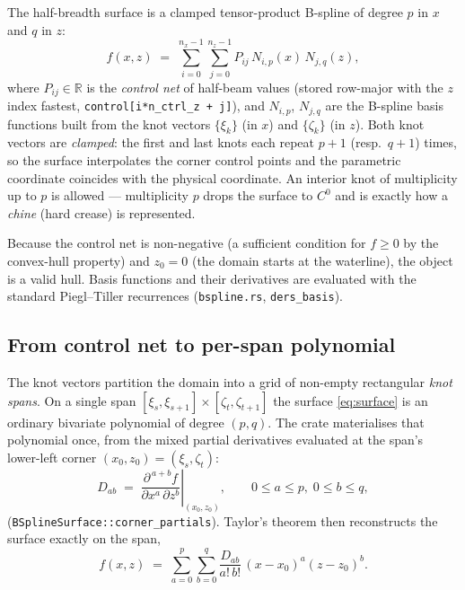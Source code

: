 \documentclass[11pt]{article}
\begin{document}
The half-breadth surface is a clamped tensor-product B-spline of degree $p$ in
$x$ and $q$ in $z$:
\begin{equation}
  f(x, z) \;=\; \sum_{i=0}^{n_x-1}\sum_{j=0}^{n_z-1}
     P_{ij}\, N_{i,p}(x)\, N_{j,q}(z),
  \label{eq:surface}
\end{equation}
where $P_{ij} \in \mathbb{R}$ is the \emph{control net} of half-beam values
(stored row-major with the $z$ index fastest, \texttt{control[i*n\_ctrl\_z + j]}),
and $N_{i,p}$, $N_{j,q}$ are the B-spline basis functions built from the knot
vectors $\{\xi_k\}$ (in $x$) and $\{\zeta_k\}$ (in $z$). Both knot vectors are
\emph{clamped}: the first and last knots each repeat $p+1$ (resp.\ $q+1$) times,
so the surface interpolates the corner control points and the parametric
coordinate coincides with the physical coordinate. An interior knot of
multiplicity up to $p$ is allowed --- multiplicity $p$ drops the surface to
$C^{0}$ and is exactly how a \emph{chine} (hard crease) is represented.

Because the control net is non-negative (a sufficient condition for
$f \ge 0$ by the convex-hull property) and $z_0 = 0$ (the domain starts at the
waterline), the object is a valid hull. Basis functions and their derivatives
are evaluated with the standard Piegl--Tiller recurrences
(\texttt{bspline.rs}, \texttt{ders\_basis}).

\subsection{From control net to per-span polynomial}
\label{sec:spanpoly}

The knot vectors partition the domain into a grid of non-empty rectangular
\emph{knot spans}. On a single span
$[\xi_{s}, \xi_{s+1}] \times [\zeta_{t}, \zeta_{t+1}]$ the surface
\eqref{eq:surface} is an ordinary bivariate polynomial of degree $(p, q)$. The
crate materialises that polynomial once, from the mixed partial derivatives
evaluated at the span's lower-left corner $(x_0, z_0) = (\xi_s, \zeta_t)$:
\begin{equation}
  D_{ab} \;=\; \left.\frac{\partial^{\,a+b} f}{\partial x^{a}\,\partial z^{b}}
    \right|_{(x_0, z_0)},
  \qquad 0 \le a \le p,\; 0 \le b \le q,
  \label{eq:corner}
\end{equation}
(\texttt{BSplineSurface::corner\_partials}). Taylor's theorem then reconstructs
the surface exactly on the span,
\begin{equation}
  f(x, z) \;=\; \sum_{a=0}^{p}\sum_{b=0}^{q}
    \frac{D_{ab}}{a!\,b!}\,(x - x_0)^{a}(z - z_0)^{b}.
  \label{eq:taylor}
\end{equation}
\end{document}
